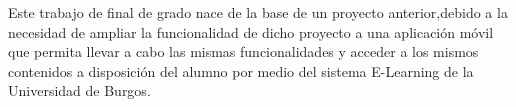 

Este trabajo de final de grado nace de la base de un proyecto anterior,debido a la necesidad de ampliar la funcionalidad de dicho proyecto a una aplicación móvil que permita llevar a cabo las mismas funcionalidades y acceder a los mismos contenidos a disposición del alumno por medio del sistema E-Learning de la Universidad de Burgos.

